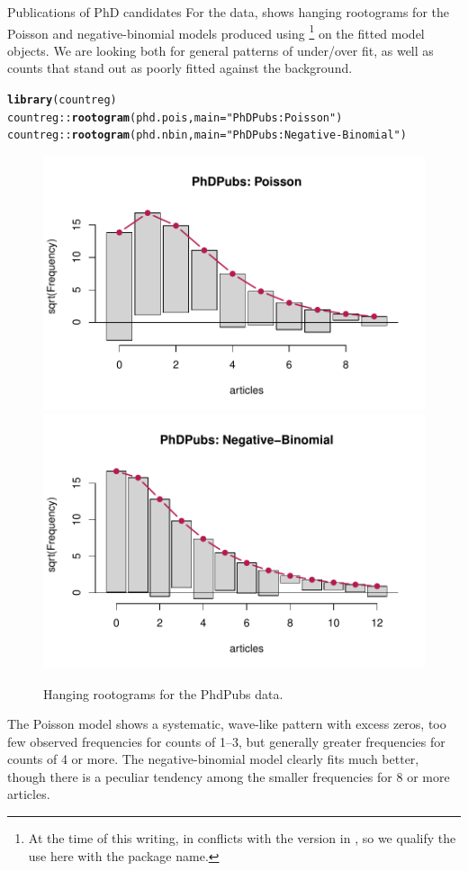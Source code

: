 \documentclass[11pt]{book}\usepackage[]{graphicx}\usepackage[]{color}
\makeatletter
\newcommand{\hlstr}[1]{\textcolor[rgb]{0.192,0.494,0.8}{#1}}%
\newcommand{\hlstd}[1]{\textcolor[rgb]{0.345,0.345,0.345}{#1}}%
\newcommand{\hlkwc}[1]{\textcolor[rgb]{0.333,0.667,0.333}{#1}}%
\newcommand{\hlkwd}[1]{\textcolor[rgb]{0.737,0.353,0.396}{\textbf{#1}}}%
\newenvironment{kframe}{%
 \def\at@end@of@kframe{}%
 \ifinner\ifhmode%
  \def\at@end@of@kframe{\end{minipage}}%
  \begin{minipage}{\columnwidth}%
 \fi\fi%
 \def\FrameCommand##1{\hskip\@totalleftmargin \hskip-\fboxsep
 \colorbox{shadecolor}{##1}\hskip-\fboxsep
     \hskip-\linewidth \hskip-\@totalleftmargin \hskip\columnwidth}%
 \MakeFramed {\advance\hsize-\width
   \@totalleftmargin\z@ \linewidth\hsize
   \@setminipage}}%
 {\par\unskip\endMakeFramed%
 \at@end@of@kframe}
\newenvironment{knitrout}{}{} %
\renewenvironment{knitrout}{\small\renewcommand{\baselinestretch}{.85}}{} %
\makeatother
\begin{document}
\begin{Example}[phdpubs4]{Publications of PhD candidates}
For the  data,  shows hanging rootograms for the
Poisson and negative-binomial models produced using %
\footnote{
At the time of this writing,  in  conflicts with
the version in , so we qualify the use here with the package name.
}
on the fitted model objects.  We are looking both for general patterns of under/over fit, as well
as counts that stand out as poorly fitted against the background.

\begin{knitrout}
\color{fgcolor}\begin{kframe}
\begin{alltt}
\hlkwd{library}\hlstd{(countreg)}
\hlstd{countreg::}\hlkwd{rootogram}\hlstd{(phd.pois,} \hlkwc{main}\hlstd{=}\hlstr{"PhDPubs: Poisson"}\hlstd{)}
\hlstd{countreg::}\hlkwd{rootogram}\hlstd{(phd.nbin,} \hlkwc{main}\hlstd{=}\hlstr{"PhDPubs: Negative-Binomial"}\hlstd{)}
\end{alltt}
\end{kframe}\begin{figure}[!htbp]


\centerline{\includegraphics[width=.49\textwidth]{ch09/fig/phdpubs4-rootogram1} 
\includegraphics[width=.49\textwidth]{ch09/fig/phdpubs4-rootogram2} }

\caption[Hanging rootograms for the PhdPubs data]{Hanging rootograms for the PhdPubs data.\label{fig:phdpubs4-rootogram}}
\end{figure}


\end{knitrout}
The Poisson model shows a systematic, wave-like pattern with excess zeros, too few observed frequencies for
counts of
1--3, but generally greater frequencies for counts of 4 or more.  The negative-binomial model
clearly fits much better, though there is a peculiar tendency among the smaller
frequencies for 8 or more articles.
\end{Example}
\end{document}
